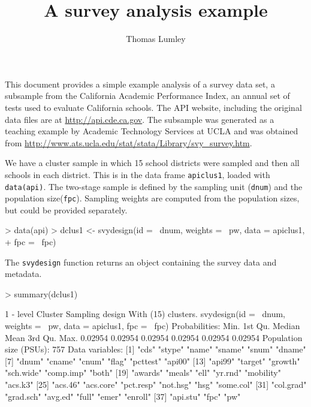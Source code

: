 \documentclass{article}
\author{Thomas Lumley}
\title{A survey analysis example}
\begin{document}
\maketitle

This document provides a simple example analysis of a survey data set,
a subsample from the California Academic Performance Index, an annual
set of tests used to evaluate California schools. The API website,
including the original data files are at
\url{http://api.cde.ca.gov}. The subsample was generated as a teaching
example by Academic Technology Services at UCLA and was obtained from
\url{http://www.ats.ucla.edu/stat/stata/Library/svy_survey.htm}.


We have a cluster sample in which 15 school districts were sampled and
then all schools in each district. This is in the data frame
\texttt{apiclus1}, loaded with \texttt{data(api)}. The two-stage sample is
defined by the sampling unit (\texttt{dnum}) and the population
size(\texttt{fpc}).  Sampling weights are computed from the population
sizes, but could be provided separately.
\begin{Schunk}
\begin{Sinput}
> data(api)
> dclus1 <- svydesign(id = ~dnum, weights = ~pw, data = apiclus1, 
+     fpc = ~fpc)
\end{Sinput}
\end{Schunk}

The \texttt{svydesign} function returns an object containing the survey data and metadata.
\begin{Schunk}
\begin{Sinput}
> summary(dclus1)
\end{Sinput}
\begin{Soutput}
1 - level Cluster Sampling design
With (15) clusters.
svydesign(id = ~dnum, weights = ~pw, data = apiclus1, fpc = ~fpc)
Probabilities:
   Min. 1st Qu.  Median    Mean 3rd Qu.    Max. 
0.02954 0.02954 0.02954 0.02954 0.02954 0.02954 
Population size (PSUs): 757 
Data variables:
 [1] "cds"      "stype"    "name"     "sname"    "snum"     "dname"   
 [7] "dnum"     "cname"    "cnum"     "flag"     "pcttest"  "api00"   
[13] "api99"    "target"   "growth"   "sch.wide" "comp.imp" "both"    
[19] "awards"   "meals"    "ell"      "yr.rnd"   "mobility" "acs.k3"  
[25] "acs.46"   "acs.core" "pct.resp" "not.hsg"  "hsg"      "some.col"
[31] "col.grad" "grad.sch" "avg.ed"   "full"     "emer"     "enroll"  
[37] "api.stu"  "fpc"      "pw"      
\end{Soutput}
\end{Schunk}
\end{document}
